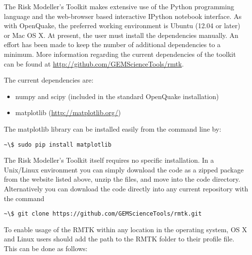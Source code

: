 The Risk Modeller's Toolkit makes extensive use of the Python programming language and the web-browser based interactive IPython notebook interface. As with OpenQuake, the preferred working environment is Ubuntu (12.04 or later) or Mac OS X. At present, the user  must install the dependencies manually. An effort has been made to keep the number of additional dependencies to a minimum. More information regarding the current dependencies of the toolkit can be found at \href{http://github.com/GEMScienceTools/rmtk}{http://github.com/GEMScienceTools/rmtk}.

The current dependencies are:
\begin{itemize}
\item numpy and scipy (included in the standard OpenQuake installation)
\item matplotlib (\href{http://matplotlib.org/}{http://matplotlib.org/})
\end{itemize}

The matplotlib library can be installed easily from the command line by:

\begin{Verbatim}[frame=single, commandchars=\\\{\}, fontsize=\scriptsize]
~\$ sudo pip install matplotlib
\end{Verbatim}

The Risk Modeller's Toolkit itself requires no specific installation. In a Unix/Linux environment you can simply download the code as a zipped package from the website listed above, unzip the files, and move into the code directory. Alternatively you can download the code directly into any current repository with the command

\begin{Verbatim}[frame=single, commandchars=\\\{\}, fontsize=\scriptsize]
~\$ git clone https://github.com/GEMScienceTools/rmtk.git
\end{Verbatim}

To enable usage of the RMTK within any location in the operating system, OS X and Linux users should add the path to the RMTK folder to their profile file. This can be done as follows:

